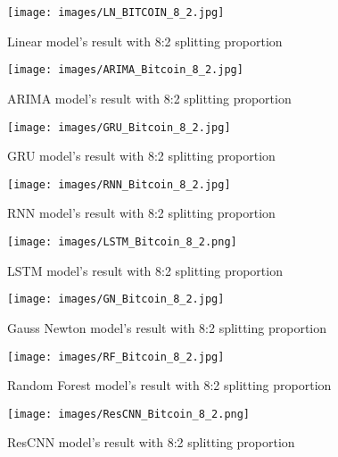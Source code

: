 \documentclass{ieeeojies}
\begin{document}
\begin{figure}[H]
  \centering
  \begin{minipage}{0.8\linewidth}
    \centering
    \texttt{[image: images/LN\_BITCOIN\_8\_2.jpg]}
    \caption{Linear model's result with 8:2 splitting proportion}
    \label{fig8}
  \end{minipage}
\end{figure}
\begin{figure}[H]
  \centering
  \begin{minipage}{0.8\linewidth}
    \centering
    \texttt{[image: images/ARIMA\_Bitcoin\_8\_2.jpg]}
    \caption{ARIMA model's result with 8:2 splitting proportion}
    \label{fig9}
  \end{minipage}
\end{figure}
\begin{figure}[H]
  \centering
  \begin{minipage}{0.8\linewidth}
    \centering
    \texttt{[image: images/GRU\_Bitcoin\_8\_2.jpg]}
    \caption{GRU model's result with 8:2 splitting proportion}
    \label{fig10}
  \end{minipage}
\end{figure}
\begin{figure}[H]
  \centering
  \begin{minipage}{0.8\linewidth}
    \centering
    \texttt{[image: images/RNN\_Bitcoin\_8\_2.jpg]}
    \caption{RNN model's result with 8:2 splitting proportion}
    \label{fig11}
  \end{minipage}
\end{figure}
\begin{figure}[H]
  \centering
  \begin{minipage}{0.8\linewidth}
    \centering
    \texttt{[image: images/LSTM\_Bitcoin\_8\_2.png]}
    \caption{LSTM model's result with 8:2 splitting proportion}
    \label{fig12}
  \end{minipage}
\end{figure}
\begin{figure}[H]
  \centering
  \begin{minipage}{0.8\linewidth}
    \centering
    \texttt{[image: images/GN\_Bitcoin\_8\_2.jpg]}
    \caption{Gauss Newton model's result with 8:2 splitting proportion}
    \label{fig13}
  \end{minipage}
\end{figure}
\begin{figure}[H]
  \centering
  \begin{minipage}{0.8\linewidth}
    \centering
    \texttt{[image: images/RF\_Bitcoin\_8\_2.jpg]}
    \caption{Random Forest model's result with 8:2 splitting proportion}
    \label{fig14}
  \end{minipage}
\end{figure}
\begin{figure}[H]
  \centering
  \begin{minipage}{0.8\linewidth}
    \centering
    \texttt{[image: images/ResCNN\_Bitcoin\_8\_2.png]}
    \caption{ResCNN model's result with 8:2 splitting proportion}
    \label{bagginggru}
  \end{minipage}
\end{figure}
\end{document}
